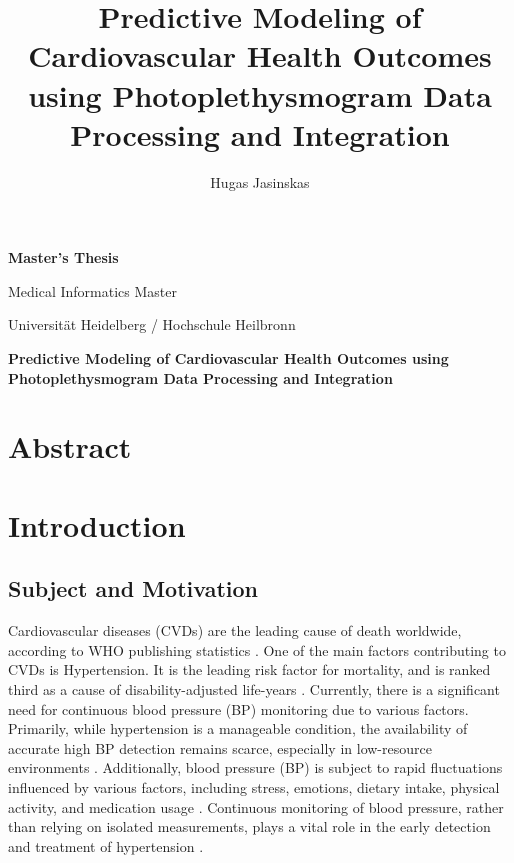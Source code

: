 \documentclass[10pt, bibliography=totoc]{scrartcl}
\title{Predictive Modeling of Cardiovascular Health Outcomes using Photoplethysmogram Data Processing and Integration}
\author{Hugas Jasinskas}
\begin{document}
\begin{titlepage}
\begin{center}
        \vspace*{1cm}
            
        \Huge
        \textbf{Master's Thesis}
            
        \vspace{0.5cm}
        \Large
        Medical Informatics Master
        
        \vspace{0.5cm}
        \Large
        Universität Heidelberg / Hochschule Heilbronn
        
        \hrulefill
            
        \vspace{1.5cm}
        
        \Huge
        \textbf{Predictive Modeling of Cardiovascular Health Outcomes using Photoplethysmogram Data Processing and Integration}
        
    \end{center}
    
\end{titlepage}

\newpage

\tableofcontents

\newpage

\section{Abstract}
\section{Introduction}
\subsection{Subject and Motivation}

Cardiovascular diseases (CVDs) are the leading cause of death worldwide, according to WHO publishing statistics \cite{organizationWorldHealthStatistics2023}. One of the main factors contributing to CVDs is Hypertension.
It is the leading risk factor for mortality, and is ranked third as a cause of disability-adjusted life-years \cite{ezzatiSelectedMajorRisk2002}.
Currently, there is a significant need for continuous blood pressure (BP) monitoring due to various factors. Primarily, while hypertension is a manageable condition, the availability of accurate high BP detection remains scarce, especially in low-resource environments \cite{burtPrevalenceHypertensionUS1995}. 
Additionally, blood pressure (BP) is subject to rapid fluctuations influenced by various factors, including stress, emotions, dietary intake, physical activity, and medication usage \cite{poonCufflessNoninvasiveMeasurements2005}.
Continuous monitoring of blood pressure, rather than relying on isolated measurements, plays a vital role in the early detection and treatment of hypertension  \cite{el-hajjDeepLearningModels2021}.
\end{document}
